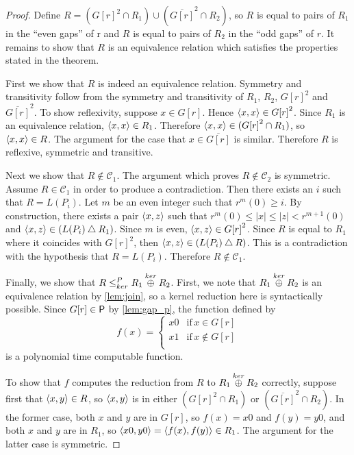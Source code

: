 \begin{proof}
  Define $R=({G[r]}^2\cap R_1)\cup(\overline{G[r]}^2\cap R_2)$, so $R$ is equal to pairs of $R_1$ in the ``even gaps'' of r and $R$ is equal to pairs of $R_2$ in the ``odd gaps'' of $r$.
  It remains to show that $R$ is an equivalence relation which satisfies the properties stated in the theorem.

  First we show that $R$ is indeed an equivalence relation.
  Symmetry and transitivity follow from the symmetry and transitivity of $R_1$, $R_2$, ${G[r]}^2$ and $\overline{G[r]}^2$.
  To show reflexivity, suppose $x\in G[r]$.
  Hence $\pair{x}{x}\in {G[r]}^2$.
  Since $R_1$ is an equivalence relation, $\pair{x}{x}\in R_1$.
  Therefore $\pair{x}{x}\in({G[r]}^2\cap R_1)$, so $\pair{x}{x}\in R$.
  The argument for the case that $x\in\overline{G[r]}$ is similar.
  Therefore $R$ is reflexive, symmetric and transitive.

  Next we show that $R\notin\mathcal{C}_1$.
  The argument which proves $R\notin\mathcal{C}_2$ is symmetric.
  Assume $R\in\mathcal{C}_1$ in order to produce a contradiction.
  Then there exists an $i$ such that $R=L(P_i)$.
  Let $m$ be an even integer such that $r^m(0)\geq i$.
  By construction, there exists a pair $\pair{x}{z}$ such that $r^m(0)\leq|x|\leq|z|<r^{m+1}(0)$ and $\pair{x}{z}\in(L(P_i)\symdiff R_1)$.
  Since $m$ is even, $\pair{x}{z}\in {G[r]}^2$.
  Since $R$ is equal to $R_1$ where it coincides with ${G[r]}^2$, then $\pair{x}{z}\in(L(P_i)\symdiff R)$.
  This is a contradiction with the hypothesis that $R=L(P_i)$.
  Therefore $R\notin\mathcal{C}_1$.

  Finally, we show that $R\kr R_1\kj R_2$.
  First, we note that $R_1\kj R_2$ is an equivalence relation by \autoref{lem:join}, so a kernel reduction here is syntactically possible.
  Since $G[r]\in\P$ by \autoref{lem:gap_p}, the function defined by
  \begin{displaymath}
    f(x)=
    \begin{cases}
      x0 & \text{if}\, x\in G[r]\\
      x1 & \text{if}\, x\notin G[r]\\
    \end{cases}
  \end{displaymath}
  is a polynomial time computable function.
  
  To show that $f$ computes the reduction from $R$ to $R_1\kj R_2$ correctly, suppose first that $\pair{x}{y}\in R$, so $\pair{x}{y}$ is in either $({G[r]}^2\cap R_1)$ or $(\overline{G[r]}^2\cap R_2)$.
  In the former case, both $x$ and $y$ are in $G[r]$, so $f(x)=x0$ and $f(y)=y0$, and both $x$ and $y$ are in $R_1$, so $\pair{x0}{y0}=\pair{f(x)}{f(y)}\in R_1$.
  The argument for the latter case is symmetric.


\end{proof}
